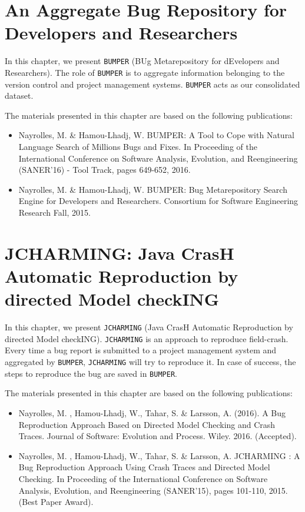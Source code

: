 
\chapter{An Aggregate Bug Repository for Developers and Researchers\label{chap:bumper}}

In this chapter, we present {\tt BUMPER} (BUg Metarepository for dEvelopers and Researchers).
The role of {\tt BUMPER} is to aggregate information belonging to the version control and project management systems.
{\tt BUMPER} acts as our consolidated dataset.

The materials presented in this chapter are based on the following publications:

\begin{itemize}
	\item Nayrolles, M. \& Hamou-Lhadj, W. BUMPER: A Tool to Cope with Natural Language Search of Millions Bugs and Fixes. In Proceeding of the International Conference on Software Analysis, Evolution, and Reengineering (SANER'16) - Tool Track, pages 649-652, 2016.
	\item Nayrolles, M. \& Hamou-Lhadj, W. BUMPER: Bug Metarepository Search Engine for Developers and Researchers. Consortium for Software Engineering Research Fall, 2015.
\end{itemize}



\chapter{JCHARMING: Java CrasH Automatic Reproduction by directed Model checkING\label{chap:jcharming}}

In this chapter, we present {\tt JCHARMING} (Java CrasH Automatic Reproduction by directed Model checkING).
{\tt JCHARMING} is an approach to reproduce field-crash.
Every time a bug report is submitted to a project management system and aggregated by {\tt BUMPER}, {\tt JCHARMING} will try to reproduce it.
In case of success, the steps to reproduce the bug are saved in {\tt BUMPER}.

The materials presented in this chapter are based on the following publications:

\begin{itemize}
	\item Nayrolles, M. , Hamou-Lhadj, W., Tahar, S. & Larsson, A. (2016). A Bug Reproduction Approach Based on Directed Model Checking and Crash Traces. Journal of Software: Evolution and Process. Wiley. 2016. (Accepted).
	\item Nayrolles, M. , Hamou-Lhadj, W., Tahar, S. & Larsson, A. JCHARMING : A Bug Reproduction Approach Using Crash Traces and Directed Model Checking. In Proceeding of the International Conference on Software Analysis, Evolution, and Reengineering (SANER'15), pages 101-110, 2015. (Best Paper Award).
\end{itemize}

